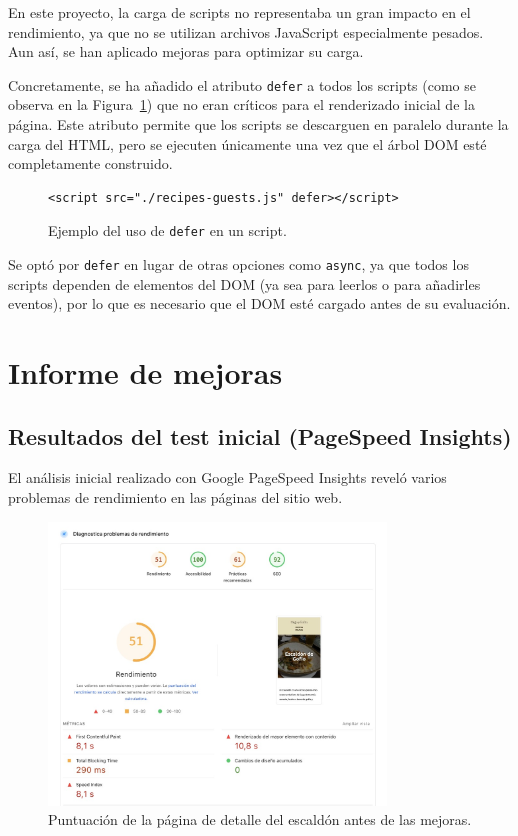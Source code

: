 \documentclass{article}
\begin{document}
En este proyecto, la carga de scripts no representaba un gran impacto en el rendimiento, ya que no se utilizan archivos JavaScript especialmente pesados. Aun así, se han aplicado mejoras para optimizar su carga.

Concretamente, se ha añadido el atributo \texttt{defer} a todos los scripts (como se observa en la Figura~\ref{fig:defer-script}) que no eran críticos para el renderizado inicial de la página. Este atributo permite que los scripts se descarguen en paralelo durante la carga del HTML, pero se ejecuten únicamente una vez que el árbol DOM esté completamente construido.

\begin{figure}[h!]
\begin{verbatim}
<script src="./recipes-guests.js" defer></script>
\end{verbatim}
\caption{Ejemplo del uso de \texttt{defer} en un script.}
\label{fig:defer-script}
\end{figure}

Se optó por \texttt{defer} en lugar de otras opciones como \texttt{async}, ya que todos los scripts dependen de elementos del DOM (ya sea para leerlos o para añadirles eventos), por lo que es necesario que el DOM esté cargado antes de su evaluación.

\section{Informe de mejoras}\label{sec:informe-de-mejoras}

\subsection{Resultados del test inicial (PageSpeed Insights)}\label{subsec:resultados-del-test-inicial}

El análisis inicial realizado con Google PageSpeed Insights reveló varios problemas de rendimiento en las páginas del sitio web.

\begin{figure}[h!]
    \centering
    \includegraphics[width=0.8\textwidth]{./img/p3/escaldon-performance-before}
    \caption{Puntuación de la página de detalle del escaldón antes de las mejoras.}
    \label{fig:escaldon-performance-before}
\end{figure}
\end{document}
